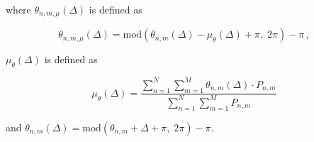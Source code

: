 \documentclass[a4paper,11pt]{article}
\begin{document}
where $\theta_{n,m,\mu}(\Delta)$ is defined as

\begin{equation}
\theta_{n,m,\mu}(\Delta) = \mathrm{mod}\!\left(\theta_{n,m}(\Delta) - \mu_{\theta}(\Delta) + \pi,\; 2\pi\right) - \pi\,,
\label{eq:A5}
\end{equation}

$\mu_{\theta}(\Delta)$ is defined as

\begin{equation}
\mu_{\theta}(\Delta) = \frac{\displaystyle\sum_{n=1}^{N}\sum_{m=1}^{M}\theta_{n,m}(\Delta)\cdot P_{n,m}}{\displaystyle\sum_{n=1}^{N}\sum_{m=1}^{M}P_{n,m}}
\label{eq:A6}
\end{equation}

and $\theta_{n,m}(\Delta) = \mathrm{mod}\!\left(\theta_{n,m} + \Delta + \pi,\; 2\pi\right) - \pi$.
\end{document}
